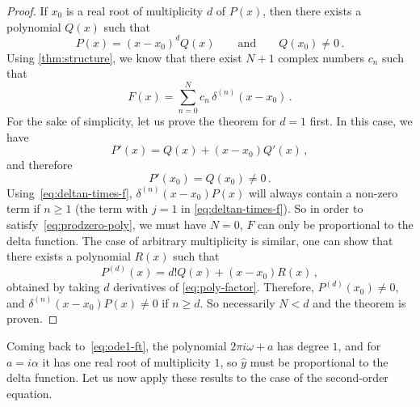 \begin{proof}
  If $x_0$ is a real root of multiplicity $d$ of $P(x)$, then there exists a polynomial
  $Q(x)$ such that
  \begin{equation}
    P(x)=(x-x_0)^dQ(x)\qquad\text{and}\qquad Q(x_0)\neq 0\,.\label{eq:poly-factor}
  \end{equation}
  Using \cref{thm:structure}, we know that there exist $N+1$ complex numbers $c_n$ such
  that
  \begin{equation}
    F(x)=\sum_{n=0}^{N}c_n\,\delta^{(n)}(x-x_0)\,.
  \end{equation}
  For the sake of simplicity, let us prove the theorem for $d=1$ first. In this case, we
  have
  \begin{equation}
    P'(x)=Q(x)+(x-x_0)Q'(x)\,,
  \end{equation}
  and therefore
  \begin{equation}
    P'(x_0)=Q(x_0)\neq 0\,.
  \end{equation}
  Using~\cref{eq:deltan-times-f}, $\delta^{(n)}(x-x_0)P(x)$ will always contain a non-zero
  term if $n\geq 1$ (\ie the term with $j=1$ in \cref{eq:deltan-times-f}). So in order to
  satisfy~\cref{eq:prodzero-poly}, we must have $N=0$, \ie $F$ can only be proportional to
  the delta function. The case of arbitrary multiplicity is similar, one can show that
  there exists a polynomial $R(x)$ such that
  \begin{equation}
    P^{(d)}(x)=d!Q(x)+(x-x_0)R(x)\,,
  \end{equation}
  obtained by taking $d$ derivatives of \cref{eq:poly-factor}. Therefore,
  $P^{(d)}(x_0)\neq 0$, and $\delta^{(n)}(x-x_0)P(x)\neq 0$ if $n\geq d$. So necessarily
  $N<d$ and the theorem is proven.
\end{proof}
Coming back to~\cref{eq:ode1-ft}, the polynomial $2\pi i\omega +a$ has degree $1$, and for
$a=i\alpha$ it has one real root of multiplicity $1$, so $\hat{y}$ must be proportional to
the delta function. Let us now apply these results to the case of the second-order
equation.
